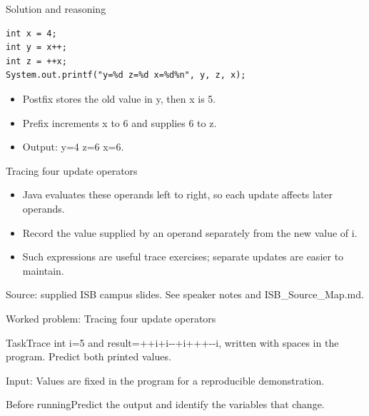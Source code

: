\documentclass[10pt,aspectratio=169]{beamer}
\begin{document}
\begin{frame}[fragile,t]{Solution and reasoning}
\begin{lstlisting}
int x = 4;
int y = x++;
int z = ++x;
System.out.printf("y=%d z=%d x=%d%n", y, z, x);
\end{lstlisting}\vspace{1mm}\small\begin{itemize}
\item Postfix stores the old value in y, then x is 5.
\item Prefix increments x to 6 and supplies 6 to z.
\item Output: y=4 z=6 x=6.
\end{itemize}
\end{frame}

\begin{frame}[fragile,t]{Tracing four update operators}
\begin{itemize}
\item Java evaluates these operands left to right, so each update affects later operands.
\item Record the value supplied by an operand separately from the new value of i.
\item Such expressions are useful trace exercises; separate updates are easier to maintain.
\end{itemize}
\vspace{3mm}\footnotesize\textcolor{accent}{Source: supplied ISB campus slides. See speaker notes and ISB\_Source\_Map.md.}
\end{frame}

\begin{frame}[fragile,t]{Worked problem: Tracing four update operators}
\begin{block}{Task}Trace int i=5 and result=++i+i{-}{-}+i+++{-}{-}i, written with spaces in the program. Predict both printed values.\end{block}
\small Input: Values are fixed in the program for a reproducible demonstration.\par\vspace{3mm}\begin{exampleblock}{Before running}Predict the output and identify the variables that change.\end{exampleblock}
\end{frame}
\end{document}
